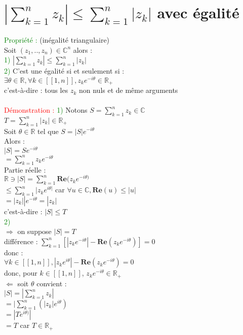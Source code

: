\documentclass{article}
\begin{document}
\section{$|\sum_{k=1}^{n}z_k| \leq \sum_{k=1}^{n} |z_k|$ avec égalité}
\textcolor{green}{Propriété :} (inégalité triangulaire) \\
\indent Soit $(z_1,..,z_n) \in \mathbb{C}^n$ alors : \\
\textcolor{green}{1) } $|\sum_{k=1}^n z_k| \leq \sum_{k=1}^n|z_k|$ \\
\textcolor{green}{2) } C'est une égalité si et seulement si : \\
\indent $\exists \theta \in \mathbb{R}, 
\forall k \in [[1,n]], z_k e^{-i\theta} \in \mathbb{R}_+$ \\
c'est-à-dire : tous les $z_k$ non nuls et de même arguments \\ \\
\textcolor{red}{Démonstration :} \textcolor{green}{1) } Notons $S=\sum_{k=1}^n z_k \in \mathbb{C}$ \\
\indent $T= \sum_{k=1}^n |z_k| \in \mathbb{R}_+$ \\
\indent Soit $\theta \in \mathbb{R}$ tel que $S=|S|e^{-i\theta}$ \\
Alors : \\
\indent $|S|=S e^{-i\theta}$ \\
\indent $= \sum_{k=1}^nz_ke^{-i\theta}$ \\
\indent Partie réelle : \\
\indent $ \mathbb{R} \ni |S| = \sum_{k=1}^n \mathbf{Re}(z_k e^{-i\theta)}$ \\
\indent $\leq \sum_{k=1}^n|z_ke^{i\theta|}$ car $\forall u \in \mathbb{C}, \mathbf{Re}(u) \leq |u|$ \\ \indent \indent $=|z_k||e^{-i\theta}=|z_k|$ \\
c'est-à-dire : $|S| \leq T$ \\
\textcolor{green}{2)} \\ $\Longrightarrow$ on suppose $|S|=T$ \\
différence : $\sum_{k=1}^n[|z_ke^{-i\theta}|-\mathbf{Re}(z_ke^{-i\theta})]=0$ \\
donc : \\
\indent $\forall k \in [[1,n]],|z_k e^{i\theta}|-\mathbf{Re}(z_k e^{-i\theta})=0$ \\
donc, pour $k\in [[1,n]]$, $z_ke^{-i\theta} \in \mathbb{R}_+$ \\
$\Longleftarrow$ soit $\theta$ convient : \\
\indent $|S|=|\sum_{k=1}^n z_k|$ \\
\indent $= |\sum_{k=1}^n(|z_k|e^{i\theta})$ \\
\indent $=|Te^{i\theta)}|$ \\
\indent $=T$ car $T \in \mathbb{R}_+$
\end{document}
